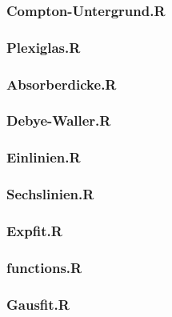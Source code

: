 \subsubsection*{Compton-Untergrund.R}\label{Compton-Untergrund}


\subsubsection*{Plexiglas.R}\label{Plexi}


\subsubsection*{Absorberdicke.R}\label{Absorberdicke}


\subsubsection*{Debye-Waller.R}\label{debye}


\subsubsection*{Einlinien.R}\label{einlinien1}


\subsubsection*{Sechslinien.R}\label{sechslinien}


\subsubsection*{Expfit.R}\label{exp}


\subsubsection*{functions.R}\label{functions}


\subsubsection*{Gausfit.R}\label{gaus}


